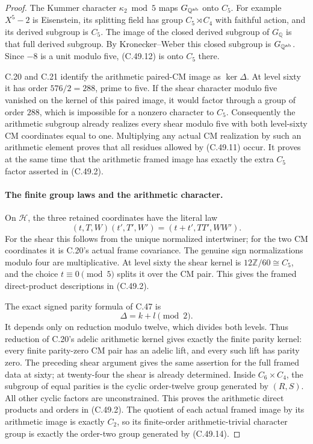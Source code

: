 \begin{proof}
The Kummer character $\kappa_2\bmod5$ maps
$G_{\mathbb Q^{\rm ab}}$ onto $C_5$.
For example $X^5-2$ is Eisenstein, its splitting field has group
$C_5\rtimes C_4$ with faithful action, and its derived subgroup
is $C_5$. The image of the closed derived subgroup of $G_{\mathbb Q}$
is that full derived subgroup. By Kronecker--Weber this closed
subgroup is $G_{\mathbb Q^{\rm ab}}$.
Since $-8$ is a unit modulo five, (C.49.12) is onto $C_5$ there.

C.20 and C.21 identify the arithmetic paired-CM image as
$\ker\Delta$. At level sixty it has order $576/2=288$, prime to five.
If the shear character modulo five vanished on the kernel of this
paired image, it would factor through a group of order $288$, which
is impossible for a nonzero character to $C_5$.
Consequently the arithmetic subgroup already realizes every shear
modulo five with both level-sixty CM coordinates equal to one.
Multiplying any actual CM realization by such an arithmetic element
proves that all residues allowed by (C.49.11) occur.
It proves at the same time that the arithmetic framed image has
exactly the extra $C_5$ factor asserted in (C.49.2).

\paragraph{The finite group laws and the arithmetic character.}
On $\mathcal H$, the three retained coordinates have the literal law
\[
 (t,T,W)(t',T',W')=(t+t',TT',WW').                       \tag{C.49.13}
\]
For the shear this follows from the unique normalized intertwiner;
for the two CM coordinates it is C.20's actual frame covariance.
The genuine sign normalizations modulo four are multiplicative.
At level sixty the shear kernel is $12\mathbb Z/60\cong C_5$,
and the choice $t\equiv0\pmod5$ splits it over the CM pair.
This gives the framed direct-product descriptions in (C.49.2).

The exact signed parity formula of C.47 is
\[
                         \Delta=k+l\pmod2.             \tag{C.49.14}
\]
It depends only on reduction modulo twelve, which divides both
levels. Thus reduction of C.20's adelic arithmetic kernel gives
exactly the finite parity kernel: every finite parity-zero CM pair
has an adelic lift, and every such lift has parity zero.
The preceding shear argument gives the same assertion for the full
framed data at sixty; at twenty-four the shear is already determined.
Inside $C_6\times C_4$, the subgroup of equal parities is the cyclic
order-twelve group generated by $(R,S)$. All other cyclic factors
are unconstrained. This proves the arithmetic direct products and
orders in (C.49.2).
The quotient of each actual framed image by its arithmetic image
is exactly $C_2$, so its finite-order arithmetic-trivial character
group is exactly the order-two group generated by (C.49.14).


\end{proof}
